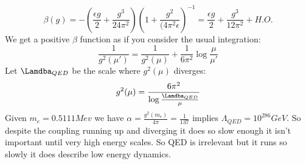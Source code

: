 \documentclass{article}
\begin{document}
$$
 \beta(g) = - ( \frac{\epsilon g}{2} + \frac{g^3}{24 \pi^2}) ( 1+ \frac{g^2}{(4 \pi^2 \epsilon})^{-1} = \frac{\epsilon g}{2} + \frac{g^3 }{12 \pi^2} + H.O.
$$
We get a positive $\beta$ function as if you consider the usual integration:
$$
 \frac{1}{g^2(\mu')} = \frac{1}{g^2( \mu)} + \frac{1}{6 \pi^2} \log \frac{\mu}{\mu'}
$$
Let $\Lamdba_{QED}$ be the scale where $g^2( \mu)$ diverges:
 $$
  g^2(\mu) = \frac{6 \pi^2}{\log \frac{\Lamdba_{QED}}{\mu}}
 $$
 Given $m_e = 0.5111 Mev$ we have $\alpha = \frac{g^2(m_e)}{4 \pi} = \frac{1}{137}$ implies $\Lambda_{QED} = 10^{286} GeV$. So despite the coupling running up and diverging it does so slow enough it isn't important until very high energy scales. So QED is irrelevant but it runs so slowly it does describe low energy dynamics.
\end{document}
